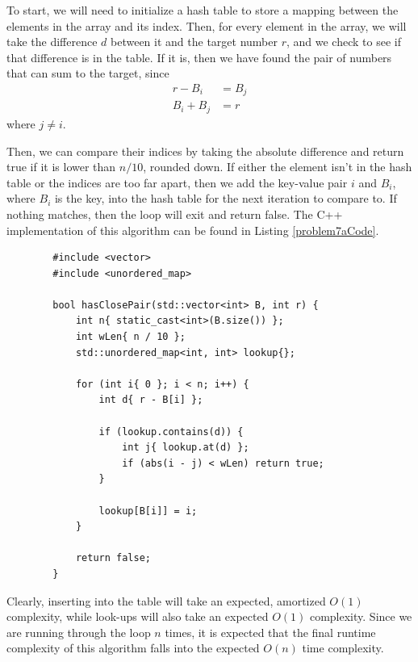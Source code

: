 \documentclass{report}
\begin{document}
To start, we will need to initialize a hash table to store a mapping between the elements in the array and its index. Then, for every element in the array, we will take the difference $d$ between it and the target number $r$, and we check to see if that difference is in the table. If it is, then we have found the pair of numbers that can sum to the target, since
\begin{align*}
	r - B_i &= B_j \\
	B_i + B_j &= r
\end{align*}
where $j \neq i$.

Then, we can compare their indices by taking the absolute difference and return true if it is lower than $n / 10$, rounded down. If either the element isn't in the hash table or the indices are too far apart, then we add the key-value pair $i$ and $B_i$, where $B_i$ is the key, into the hash table for the next iteration to compare to. If nothing matches, then the loop will exit and return false. The C++ implementation of this algorithm can be found in Listing \ref{problem7aCode}.
\begin{listing}
	\begin{verbatim}
		#include <vector>
		#include <unordered_map>
		
		bool hasClosePair(std::vector<int> B, int r) {
			int n{ static_cast<int>(B.size()) };
			int wLen{ n / 10 };
			std::unordered_map<int, int> lookup{};
			
			for (int i{ 0 }; i < n; i++) {
				int d{ r - B[i] };
				
				if (lookup.contains(d)) {
					int j{ lookup.at(d) };
					if (abs(i - j) < wLen) return true;
				}
				
				lookup[B[i]] = i;
			}
			
			return false;
		}
	\end{verbatim}
	\caption{C++ implementation of the algorithm for part A}
	\label{problem7aCode}
\end{listing}
Clearly, inserting into the table will take an expected, amortized $O(1)$ complexity, while look-ups will also take an expected $O(1)$ complexity. Since we are running through the loop $n$ times, it is expected that the final runtime complexity of this algorithm falls into the expected $O(n)$ time complexity.
\end{document}
